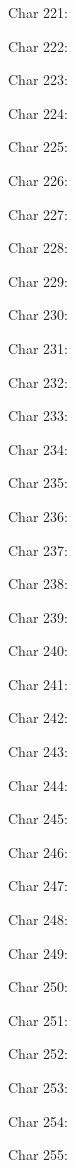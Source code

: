 Char 221: 

Char 222: 

Char 223: 

Char 224: 

Char 225: 

Char 226: 

Char 227: 

Char 228: 

Char 229: 

Char 230: 

Char 231: 

Char 232: 

Char 233: 

Char 234: 

Char 235: 

Char 236: 

Char 237: 

Char 238: 

Char 239: 

Char 240: 

Char 241: 

Char 242: 

Char 243: 

Char 244: 

Char 245: 

Char 246: 

Char 247: 

Char 248: 

Char 249: 

Char 250: 

Char 251: 

Char 252: 

Char 253: 

Char 254: 

Char 255: 

\bye

